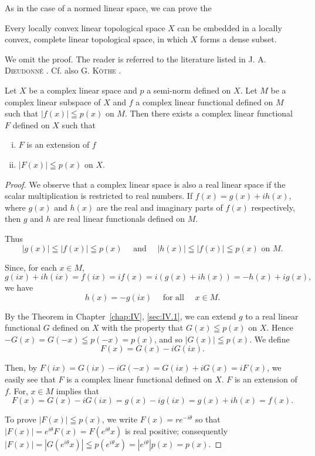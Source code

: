 As in the case of a normed linear space, we can prove the 

\begin{theoremu} Every locally convex linear topological space $X$ can be embedded in a locally convex, complete linear topological space, in which $X$ forms a dense subset. 
\end{theoremu}

We omit the proof. The reader is referred to the literature listed in J. A. \textsc{Dieudonné} \cite{dieudonne39}. Cf. also G. \textsc{Köthe} \cite{konishi164}. 


\label{sec:IV.4}

\begin{theoremn} Let $X$ be a complex linear space and $p$ a semi-norm defined on $X$. Let $M$ be a complex linear subspace of $X$ and $f$ a complex linear functional defined on $M$ such that $|f(x)| \leqq p(x)$ on $M$. Then there exists a complex linear functional $F$ defined on $X$ such that \begin{enumerate}[i)]
\item $F$ is an extension of $f$
\item $|F(x)| \leqq p(x)$ on $X$.
\end{enumerate}


\end{theoremn}
\begin{proof}
 We observe that a complex linear space is also a real linear space if the scalar multiplication is restricted to real numbers. If $f(x) = g(x) + ih(x)$, where $g(x)$ and $h(x)$ are the real and imaginary parts of $f(x)$ respectively, then $g$ and $h$ are real linear functionals defined on $M$. 

Thus 
\[
\left| g (x) \right| \leqq \left| f (x) \right| \leqq p (x) \quad \text{ and } \quad \left| h (x) \right| \leqq \left| f (x) \right| \leqq p (x) \text{ on } M.
\]

Since, for each $x \in M$, 
\[
g (i x) + i h (i x) = f (i x) = i f (x) = i (g (x) + i h (x)) = - h (x) + i g (x),
\]
we have 
\[
h (x) = - g (i x) \quad \text{ for all } \quad x \in M.
\]

By the Theorem in Chapter~\ref{chap:IV}, \ref{sec:IV.1}, we can extend $g$ to a real linear functional $G$ defined on $X$ with the property that $G(x) \leqq p(x)$ on $X$. Hence $-G(x) = G(-x) \leqq p(-x) = p(x)$, and so $|G(x)| \leqq p(x)$. We define 
\[
F (x) = G (x) - i G (i x).
\]

Then, by $F(ix) = G(ix) - iG(-x) = G(ix) + iG(x) = iF(x)$, we easily see that $F$ is a complex linear functional defined on $X$. $F$ is an extension of $f$. For, $x \in M$ implies that 
\[
F (x) = G (x) - i G (i x) = g (x) - i g (i x) = g (x) + i h (x) = f (x).
\]

To prove $|F(x)| \leqq p(x)$, we write $F(x) = r e^{-i\theta}$ so that $|F(x)| = e^{i\theta} F(x) = F(e^{i\theta} x)$ is real positive; consequently $|F(x)| = |G(e^{i\theta} x)| \leqq p(e^{i\theta} x) = |e^{i\theta}| p(x) = p(x)$. 
\end{proof}


